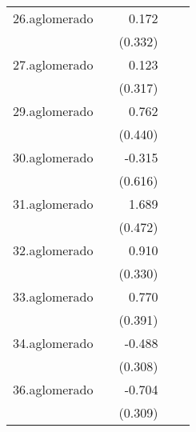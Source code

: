 {\begin{longtable}{l*{4}{D{.}{.}{-1}}}
\addlinespace
26.aglomerado&                     &       0.172         &                     &                     \\
            &                     &     (0.332)         &                     &                     \\
\addlinespace
27.aglomerado&                     &       0.123         &                     &                     \\
            &                     &     (0.317)         &                     &                     \\
\addlinespace
29.aglomerado&                     &       0.762         &                     &                     \\
            &                     &     (0.440)         &                     &                     \\
\addlinespace
30.aglomerado&                     &      -0.315         &                     &                     \\
            &                     &     (0.616)         &                     &                     \\
\addlinespace
31.aglomerado&                     &       1.689\sym{***}&                     &                     \\
            &                     &     (0.472)         &                     &                     \\
\addlinespace
32.aglomerado&                     &       0.910\sym{**} &                     &                     \\
            &                     &     (0.330)         &                     &                     \\
\addlinespace
33.aglomerado&                     &       0.770\sym{*}  &                     &                     \\
            &                     &     (0.391)         &                     &                     \\
\addlinespace
34.aglomerado&                     &      -0.488         &                     &                     \\
            &                     &     (0.308)         &                     &                     \\
\addlinespace
36.aglomerado&                     &      -0.704\sym{*}  &                     &                     \\
            &                     &     (0.309)         &                     &                     \\

\end{longtable}}
